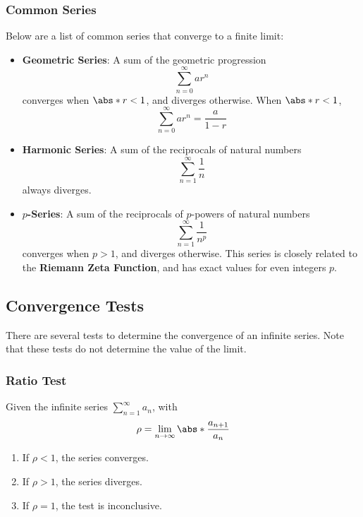 \documentclass{article}
\begin{document}
\subsubsection{Common Series}
Below are a list of common series that converge to a finite limit:
\begin{itemize}
    \item \textbf{Geometric Series}: A sum of the geometric progression
          \begin{equation*}
              \sum_{n=0}^{\infty} a r^n
          \end{equation*}
          converges when \(\abs*{r} < 1\), and diverges otherwise. When
          \(\abs*{r} < 1\),
          \begin{equation*}
              \sum_{n=0}^{\infty} a r^n = \frac{a}{1 - r}
          \end{equation*}
    \item \textbf{Harmonic Series}: A sum of the reciprocals of natural numbers
          \begin{equation*}
              \sum_{n=1}^{\infty} \frac{1}{n}
          \end{equation*}
          always diverges.
    \item \textbf{\(p\)-Series}: A sum of the reciprocals of \(p\)-powers of
          natural numbers
          \begin{equation*}
              \sum_{n=1}^{\infty} \frac{1}{n^p}
          \end{equation*}
          converges when \(p > 1\), and diverges otherwise. This series is
          closely related to the \textbf{Riemann Zeta Function}, and has
          exact values for even integers \(p\).
\end{itemize}
\subsection{Convergence Tests}
There are several tests to determine the convergence of an infinite
series. Note that these tests do not determine the value of the limit.
\subsubsection{Ratio Test}
Given the infinite series \(\sum_{n=1}^{\infty} a_n\), with
\begin{equation*}
    \rho = \lim_{n \to \infty} \abs*{\frac{a_{n+1}}{a_n}}
\end{equation*}
\begin{enumerate}[label=(\arabic*)]
    \item If \(\rho < 1\), the series converges.
    \item If \(\rho > 1\), the series diverges.
    \item If \(\rho = 1\), the test is inconclusive.
\end{enumerate}
\end{document}
